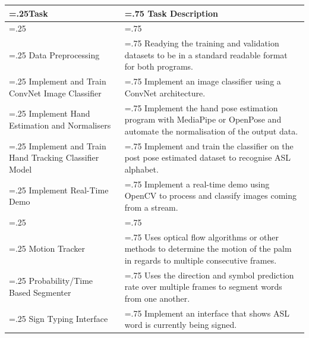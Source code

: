 \documentclass[11pt]{article}
\begin{document}
        \begin{center}
        \begin{tabularx}{1\textwidth}
            { 
            | >{\raggedright\arraybackslash\hsize=.25\hsize}X 
            | >{\raggedright\arraybackslash\hsize=.75\hsize}X | 
            }
            \hline
                \textbf{Task} & \textbf{Task Description} \\ [0.5ex] 
            \hline

            \hline
            \hline
                \multicolumn{2}{| l |}{\textit{Static ASL Interpreter}} \\ 
                \hline
                Data Preprocessing & Readying the training and validation datasets to be in a standard readable format for both programs. \\
                \hline
                Implement and Train ConvNet Image Classifier & Implement an image classifier using a ConvNet architecture. \\
                \hline
                Implement Hand Estimation and Normalisers & Implement the hand pose estimation program with MediaPipe or OpenPose and automate the normalisation of the output data. \\
                \hline 
                Implement and Train Hand Tracking Classifier Model & Implement and train the classifier on the post pose estimated dataset to recognise ASL alphabet. \\
                \hline
                Implement Real-Time Demo & Implement a real-time demo using OpenCV to process and classify images coming from a stream. \\
            \hline
            
            \hline
            \hline
                \multicolumn{2}{| l |}{\textit{Dynamic ASL Interpreter}} \\ 
                \hline
                Motion Tracker & Uses optical flow algorithms or other methods to determine the motion of the palm in regards to multiple consecutive frames. \\
                \hline
                Probability/Time Based Segmenter & Uses the direction and symbol prediction rate over multiple frames to segment words from one another. \\
                \hline
                Sign Typing Interface & Implement an interface that shows ASL word is currently being signed. \\
            \hline
        \end{tabularx}
        \end{center}
\end{document}
